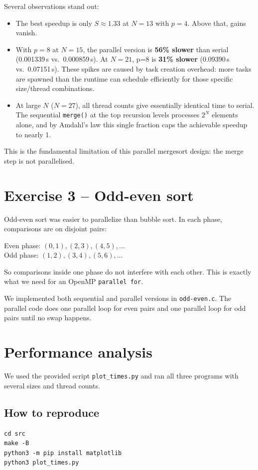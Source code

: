 \documentclass[11pt,a4paper]{article}
\begin{document}
Several observations stand out:
\begin{itemize}
    \item The best speedup is only $S \approx 1.33$ at $N=13$ with $p=4$. Above that, gains vanish.
    \item With $p=8$ at $N=15$, the parallel version is \textbf{56\% slower} than serial (0.001339\,s vs.\ 0.000859\,s). At $N=21$, p=8 is \textbf{31\% slower} (0.09390\,s vs.\ 0.07151\,s). These spikes are caused by task creation overhead: more tasks are spawned than the runtime can schedule efficiently for those specific size/thread combinations.
    \item At large $N$ ($N=27$), all thread counts give essentially identical time to serial. The sequential \texttt{merge()} at the top recursion levels processes $2^N$ elements alone, and by Amdahl's law this single fraction caps the achievable speedup to nearly 1.
\end{itemize}
This is the fundamental limitation of this parallel mergesort design: the merge step is not parallelised.

\section{Exercise 3 -- Odd-even sort}
Odd-even sort was easier to parallelize than bubble sort. In each phase, comparisons are on disjoint pairs:

Even phase: $(0,1), (2,3), (4,5), \dots$\\
Odd phase: $(1,2), (3,4), (5,6), \dots$

So comparisons inside one phase do not interfere with each other. This is exactly what we need for an OpenMP \texttt{parallel for}.

We implemented both sequential and parallel versions in \texttt{odd-even.c}. The parallel code does one parallel loop for even pairs and one parallel loop for odd pairs until no swap happens.

\section{Performance analysis}
We used the provided script \texttt{plot\_times.py} and ran all three programs with several sizes and thread counts.

\subsection*{How to reproduce}
\begin{verbatim}
cd src
make -B
python3 -m pip install matplotlib
python3 plot_times.py
\end{verbatim}
\end{document}
